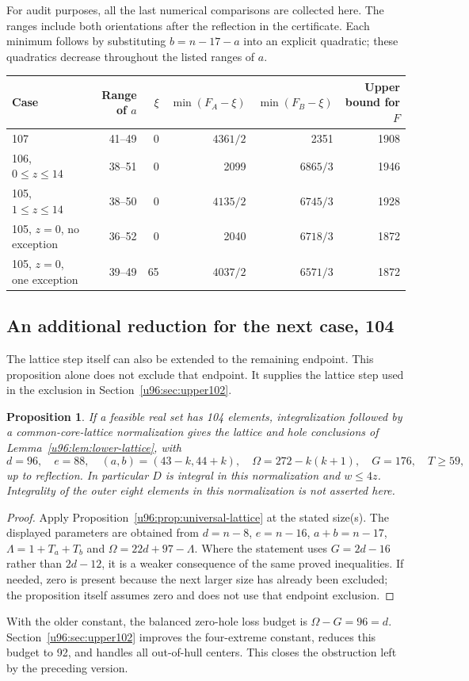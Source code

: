 \documentclass[11pt,a4paper]{article}
\newtheorem{proposition}[theorem]{Proposition}
\theoremstyle{remark}
\begin{document}
For audit purposes, all the last numerical comparisons are collected here.
The ranges include both orientations after the reflection in the certificate.
Each minimum follows by substituting $b=n-17-a$ into an explicit quadratic;
these quadratics decrease throughout the listed ranges of $a$.
\begin{center}\small
\begin{tabular}{lrrrrr}
\toprule
Case&Range of $a$&$\xi$&$\min(F_A-\xi)$&$\min(F_B-\xi)$&Upper bound for $F$\\
\midrule
107&41--49&0&$4361/2$&2351&1908\\
106, $0\leq z\leq14$&38--51&0&2099&$6865/3$&1946\\
105, $1\leq z\leq14$&38--50&0&$4135/2$&$6745/3$&1928\\
105, $z=0$, no exception&36--52&0&2040&$6718/3$&1872\\
105, $z=0$, one exception&39--49&65&$4037/2$&$6571/3$&1872\\
\bottomrule
\end{tabular}
\end{center}

\subsection{An additional reduction for the next case, 104}
The lattice step itself can also be extended to the remaining endpoint.
This proposition alone does not exclude that endpoint. It supplies the
lattice step used in the exclusion in Section~\ref{u96:sec:upper102}.
\begin{proposition}\label{u96:prop:104-lattice}
If a feasible real set has 104 elements, integralization followed by a
common-core-lattice normalization gives the lattice and hole conclusions
of Lemma~\ref{u96:lem:lower-lattice}, with
\[
 d=96,\quad e=88,\quad (a,b)=(43-k,44+k),\quad
 \Omega=272-k(k+1),\quad G=176,\quad T\geq59,
\]
up to reflection. In particular $D$ is integral in this normalization and
$w\leq4z$. Integrality of the outer eight elements in this normalization
is not asserted here.
\end{proposition}
\begin{proof}
Apply Proposition~\ref{u96:prop:universal-lattice} at the stated size(s).
The displayed parameters are obtained from $d=n-8$, $e=n-16$,
$a+b=n-17$, $\Lambda=1+T_a+T_b$ and $\Omega=22d+97-\Lambda$.
Where the statement uses $G=2d-16$ rather than $2d-12$, it is a weaker
consequence of the same proved inequalities. If needed, zero is present
because the next larger size has already been excluded; the proposition
itself assumes zero and does not use that endpoint exclusion.
\end{proof}
With the older constant, the balanced zero-hole loss budget is
$\Omega-G=96=d$. Section~\ref{u96:sec:upper102} improves the four-extreme
constant, reduces this budget to 92, and handles all out-of-hull centers.
This closes the obstruction left by the preceding version.
\end{document}
